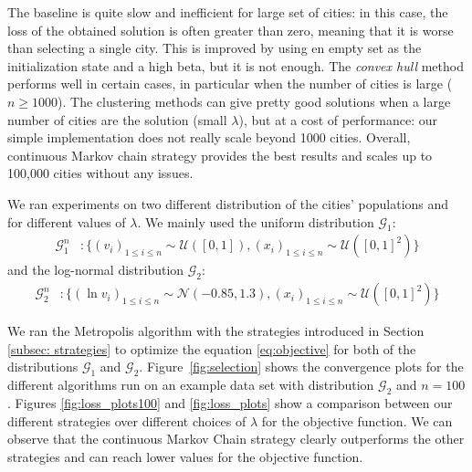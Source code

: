 \documentclass[conference,compsoc]{IEEEtran}
\begin{document}
The baseline is quite slow and inefficient for large set of cities: in this
case, the loss of the obtained solution is often greater than zero, meaning that
it is worse than selecting a single city. This is improved by using en empty set
as the initialization state and a high beta, but it is not enough. The
\textit{convex hull} method performs well in certain cases, in particular when
the number of cities is large ($ n \geq 1000$). The clustering methods can give
pretty good solutions when a large number of cities are the solution (small
$\lambda$), but at a cost of performance: our simple implementation does not
really scale beyond 1000 cities. Overall, continuous Markov chain strategy
provides the best results and scales up to 100,000 cities without any issues.

We ran experiments on two different distribution of the cities' populations and
for different values of $\lambda$. We mainly used the uniform distribution
$\mathcal{G}_1$:
\begin{align*}
    \mathcal{G}_1^n &: \lbrace (v_i)_{1\leq i \leq n} \sim \mathcal{U}([0, 1]),  (x_i)_{1\leq i \leq n} \sim \mathcal{U}([0, 1]^2) \rbrace
\end{align*}
and the log-normal distribution $\mathcal{G}_2$:
\begin{align*}
    \mathcal{G}_2^n &: \lbrace (\ln v_i)_{1\leq i \leq n} \sim \mathcal{N}(-0.85, 1.3),  (x_i)_{1\leq i \leq n} \sim \mathcal{U}([0, 1]^2)\rbrace
\end{align*}

We ran the Metropolis algorithm with the strategies introduced in Section
\ref{subsec: strategies} to optimize the equation \eqref{eq:objective} for both
of the distributions $\mathcal{G}_1$ and $\mathcal{G}_2$.
Figure~\ref{fig:selection} shows the convergence plots for the different
algorithms run on an example data set with distribution $\mathcal{G}_2$ and $n =
100$. Figures \ref{fig:loss_plots100} and \ref{fig:loss_plots} show a comparison
between our different strategies over different choices of $\lambda$ for the
objective function. We can observe that the continuous Markov Chain strategy
clearly outperforms the other strategies and can reach lower values for the
objective function.
\end{document}
